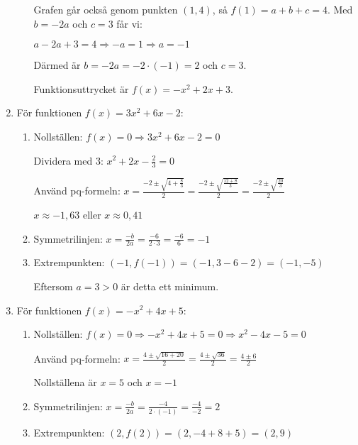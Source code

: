 \documentclass[a4paper,11pt]{article}
\begin{document}
\begin{enumerate}[label=\textbf{\arabic*.}]
\begin{enumerate}[label=\alph*)]
        Grafen går också genom punkten $(1, 4)$, så $f(1) = a + b + c = 4$. Med $b = -2a$ och $c = 3$ får vi:
        
        $a - 2a + 3 = 4 \Rightarrow -a = 1 \Rightarrow a = -1$
        
        Därmed är $b = -2a = -2 \cdot (-1) = 2$ och $c = 3$.
        
        Funktionsuttrycket är $f(x) = -x^2 + 2x + 3$.
    \end{enumerate}

    \item För funktionen $f(x) = 3x^2 + 6x - 2$:
    \begin{enumerate}[label=\alph*)]
        \item Nollställen: $f(x) = 0 \Rightarrow 3x^2 + 6x - 2 = 0$
        
        Dividera med 3: $x^2 + 2x - \frac{2}{3} = 0$
        
        Använd pq-formeln: $x = \frac{-2 \pm \sqrt{4+\frac{8}{3}}}{2} = \frac{-2 \pm \sqrt{\frac{12+8}{3}}}{2} = \frac{-2 \pm \sqrt{\frac{20}{3}}}{2}$
        
        $x \approx -1,63$ eller $x \approx 0,41$
        
        \item Symmetrilinjen: $x = \frac{-b}{2a} = \frac{-6}{2 \cdot 3} = \frac{-6}{6} = -1$
        
        \item Extrempunkten: $(-1, f(-1)) = (-1, 3 - 6 - 2) = (-1, -5)$
        
        Eftersom $a = 3 > 0$ är detta ett minimum.
    \end{enumerate}
    
    \item För funktionen $f(x) = -x^2 + 4x + 5$:
    \begin{enumerate}[label=\alph*)]
        \item Nollställen: $f(x) = 0 \Rightarrow -x^2 + 4x + 5 = 0 \Rightarrow x^2 - 4x - 5 = 0$
        
        Använd pq-formeln: $x = \frac{4 \pm \sqrt{16+20}}{2} = \frac{4 \pm \sqrt{36}}{2} = \frac{4 \pm 6}{2}$
        
        Nollställena är $x = 5$ och $x = -1$
        
        \item Symmetrilinjen: $x = \frac{-b}{2a} = \frac{-4}{2 \cdot (-1)} = \frac{-4}{-2} = 2$
        
        \item Extrempunkten: $(2, f(2)) = (2, -4 + 8 + 5) = (2, 9)$
        

\end{enumerate}
\end{enumerate}
\end{document}
